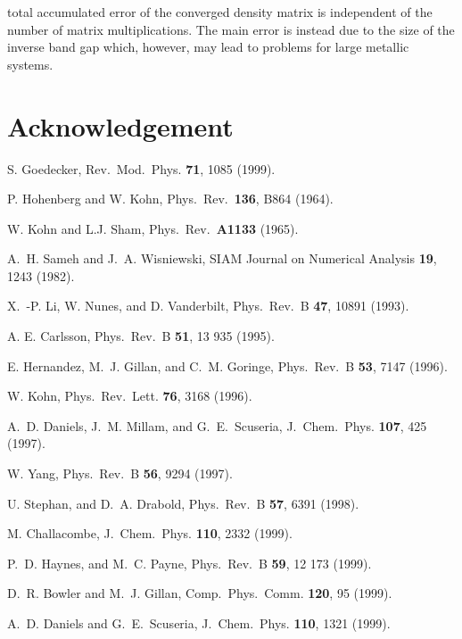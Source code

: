 \commentoutA{\documentclass[prb,aps,twocolumn,twocolumngrid,secnumarabic,superbib,hyperref]{revtex4}}
\begin{document}
{total accumulated error of the converged density matrix is independent
of the number of matrix multiplications. The main error 
is instead due to the size of the inverse band gap which, however,
may lead to problems for large metallic systems.

\section{Acknowledgement}






\begin{references}

 S. Goedecker,
Rev.\ Mod.\ Phys. {\bf 71}, 1085 (1999).

 P. Hohenberg and W. Kohn,
Phys.\ Rev.\ {\bf 136}, B864 (1964).

 W. Kohn and L.J. Sham,
Phys.\ Rev.\ {\bf A1133} (1965).

  A.\ H. Sameh and J.\ A. Wisniewski,
SIAM Journal on Numerical Analysis {\bf 19}, 1243 (1982).

 X.\ -P. Li, W. Nunes, and D. Vanderbilt,
Phys.\ Rev.\ B {\bf 47}, 10891 (1993).

 A. E. Carlsson,
Phys.\ Rev.\ B {\bf 51}, 13 935 (1995).

 E. Hernandez, M.\ J. Gillan, and C.\ M. Goringe,
Phys.\ Rev.\ B {\bf 53}, 7147 (1996).

 W. Kohn,
Phys.\ Rev.\ Lett. {\bf 76}, 3168 (1996).

 A.\ D. Daniels, J.\ M. Millam, and G.\ E.\ Scuseria,
J.\ Chem.\ Phys. {\bf 107}, 425 (1997).

 W. Yang,
Phys.\ Rev.\ B {\bf 56}, 9294 (1997).

 U. Stephan, and D.\ A. Drabold,
Phys.\ Rev.\ B {\bf 57}, 6391 (1998).

 M. Challacombe,
J.\ Chem.\ Phys. {\bf 110}, 2332 (1999).

 P.\ D. Haynes, and M.\ C. Payne,
Phys.\ Rev.\ B {\bf 59}, 12 173 (1999).

 D.\ R. Bowler and M.\ J. Gillan,
Comp.\ Phys.\ Comm. {\bf 120}, 95 (1999).

 A.\ D. Daniels and G.\ E.\ Scuseria,
J.\ Chem.\ Phys. {\bf 110}, 1321 (1999).


\end{references}}
\end{document}
